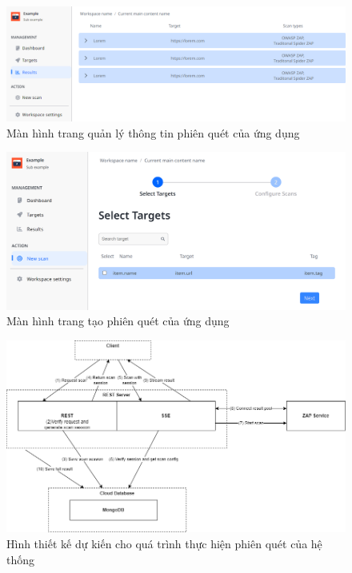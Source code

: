 \begin{figure}[H]
    \centering
    \includegraphics[width=\textwidth]{images/prototype/prototype_25102022/dashboard_result.png}
    \caption{Màn hình trang quản lý thông tin phiên quét của ứng dụng}
\end{figure}

\begin{figure}[H]
    \centering
    \includegraphics[width=\textwidth]{images/prototype/prototype_22112022/dashboad_new scan_select target.png}
    \caption{Màn hình trang tạo phiên quét của ứng dụng}
\end{figure}

\begin{figure}[H]
    \centering
    \includegraphics[width=\textwidth]{images/diagram/diagram_04112023/Scan Process.png}
    \caption{Hình thiết kế dự kiến cho quá trình thực hiện phiên quét của hệ thống}
\end{figure}

